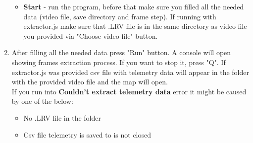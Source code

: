 \documentclass[a4paper,12pt]{book}
\begin{document}
\begin{enumerate}
\begin{itemize}
		\item \textbf{Start} - run the program, before that make sure you filled all the needed data (video file, save directory and frame step). If running with extractor.js make sure that .LRV file is in the same directory as video file you provided via "Choose video file" button.
	\end{itemize}
	\item \begin{minipage}[t]{\linewidth}
		\raggedright
		\medskip	
	\end{minipage}
	After filling all the needed data press "Run" button. A console will open showing frames extraction process. If you want to stop it, press "Q". If extractor.js was provided csv file with telemetry data will appear in the folder with the provided video file and the map will open.\\
	If you run into \textbf{Couldn't extract telemetry data} error it might be caused by one of the below:
	\begin{itemize}
		\item No .LRV file in the folder
		\item Csv file telemetry is saved to is not closed
	\end{itemize}
\end{enumerate}
\end{document}
